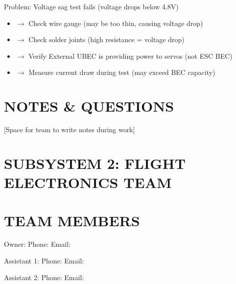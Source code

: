 \documentclass[11pt,letterpaper]{article}
\begin{document}
Problem: Voltage sag test fails (voltage drops below 4.8V)\par

\begin{itemize}
  \item $\rightarrow$ Check wire gauge (may be too thin, causing voltage drop)
  \item $\rightarrow$ Check solder joints (high resistance = voltage drop)
  \item $\rightarrow$ Verify External UBEC is providing power to servos (not ESC BEC)
  \item $\rightarrow$ Measure current draw during test (may exceed BEC capacity)
\end{itemize}

\section{NOTES \& QUESTIONS}

[Space for team to write notes during work]\par

\section{SUBSYSTEM 2: FLIGHT ELECTRONICS TEAM}

\section{TEAM MEMBERS}

Owner:         \underline{\hspace{4.8cm}}  Phone: \underline{\hspace{1.7999999999999998cm}}  Email: \underline{\hspace{1.95cm}}\par

Assistant 1:   \underline{\hspace{4.8cm}}  Phone: \underline{\hspace{1.7999999999999998cm}}  Email: \underline{\hspace{1.95cm}}\par

Assistant 2:   \underline{\hspace{4.8cm}}  Phone: \underline{\hspace{1.7999999999999998cm}}  Email: \underline{\hspace{1.95cm}}\par
\end{document}

